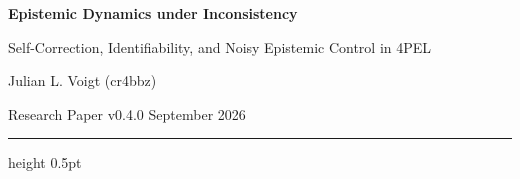 \documentclass[11pt,a4paper]{article}
\theoremstyle{definition}
\begin{document}
\begin{titlepage}
\thispagestyle{empty}
\vspace*{7mm}

{\fontsize{23}{27}\selectfont\bfseries Epistemic Dynamics under Inconsistency\par}
\vspace{3mm}
{\fontsize{15}{18}\selectfont Self-Correction, Identifiability, and Noisy Epistemic Control in 4PEL\par}

\vspace{7mm}
{\large Julian L. Voigt \quad (cr4bbz)\par}
\vspace{2mm}
{\normalsize Research Paper v0.4.0  September 2026\par}

\vspace{7mm}
\hrule height 0.5pt
\vspace{5mm}


\end{titlepage}
\end{document}
